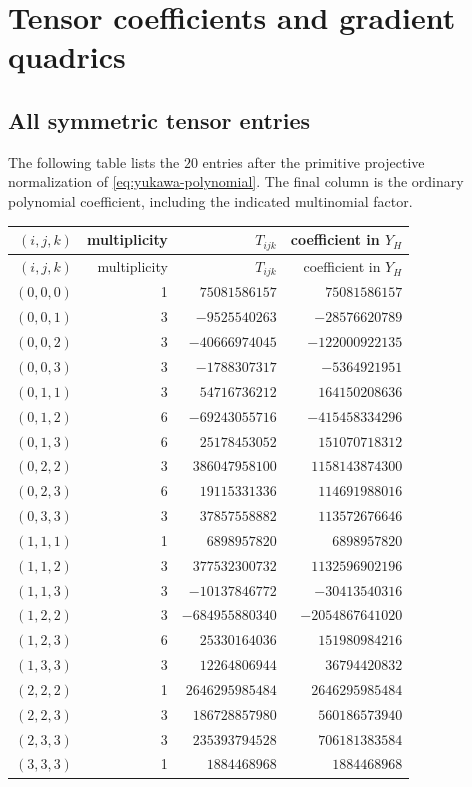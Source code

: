 \section{Tensor coefficients and gradient quadrics}
\label{app:coefficients}

\subsection{All symmetric tensor entries}

The following table lists the \(20\) entries after the primitive projective
normalization of \cref{eq:yukawa-polynomial}.  The final column is the
ordinary polynomial coefficient, including the indicated multinomial
factor.

\begin{center}
\scriptsize
\begin{longtable}{@{}rrrr@{}}
\toprule
\((i,j,k)\)&multiplicity&\(T_{ijk}\)&coefficient in \(Y_H\)\\
\midrule
\endfirsthead
\toprule
\((i,j,k)\)&multiplicity&\(T_{ijk}\)&coefficient in \(Y_H\)\\
\midrule
\endhead
\((0,0,0)\)&1&\(75081586157\)&\(75081586157\)\\
\((0,0,1)\)&3&\(-9525540263\)&\(-28576620789\)\\
\((0,0,2)\)&3&\(-40666974045\)&\(-122000922135\)\\
\((0,0,3)\)&3&\(-1788307317\)&\(-5364921951\)\\
\((0,1,1)\)&3&\(54716736212\)&\(164150208636\)\\
\((0,1,2)\)&6&\(-69243055716\)&\(-415458334296\)\\
\((0,1,3)\)&6&\(25178453052\)&\(151070718312\)\\
\((0,2,2)\)&3&\(386047958100\)&\(1158143874300\)\\
\((0,2,3)\)&6&\(19115331336\)&\(114691988016\)\\
\((0,3,3)\)&3&\(37857558882\)&\(113572676646\)\\
\((1,1,1)\)&1&\(6898957820\)&\(6898957820\)\\
\((1,1,2)\)&3&\(377532300732\)&\(1132596902196\)\\
\((1,1,3)\)&3&\(-10137846772\)&\(-30413540316\)\\
\((1,2,2)\)&3&\(-684955880340\)&\(-2054867641020\)\\
\((1,2,3)\)&6&\(25330164036\)&\(151980984216\)\\
\((1,3,3)\)&3&\(12264806944\)&\(36794420832\)\\
\((2,2,2)\)&1&\(2646295985484\)&\(2646295985484\)\\
\((2,2,3)\)&3&\(186728857980\)&\(560186573940\)\\
\((2,3,3)\)&3&\(235393794528\)&\(706181383584\)\\
\((3,3,3)\)&1&\(1884468968\)&\(1884468968\)\\
\bottomrule
\end{longtable}
\end{center}

